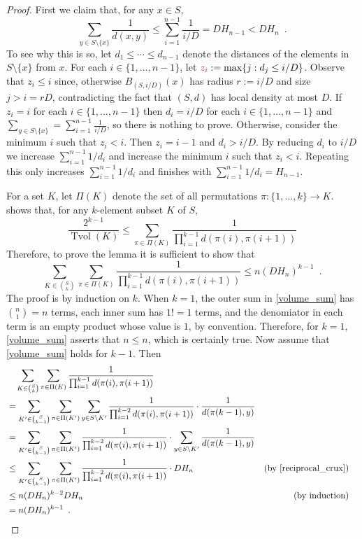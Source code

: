 \documentclass{patmorin}
\makeatletter
\def\mathcolor#1#{\@mathcolor{#1}}
\def\@mathcolor#1#2#3{%
  \protect\leavevmode
  \begingroup
    \color#1{#2}#3%
  \endgroup
}
\newcommand{\mathdefin}[1]{\mathcolor{brightmaroon}{#1}}
\DeclareMathOperator{\tvol}{Tvol}
\makeatother
\begin{document}
\begin{proof}
  First we claim that, for any $x\in S$,
  \begin{equation}
    \sum_{y\in S\setminus\{x\}} \frac{1}{d(x,y)} \le \sum_{i=1}^{n-1}\frac{1}{i/D} = DH_{n-1} < DH_n \enspace . \label{reciprocal_crux}
  \end{equation}
  To see why this is so, let $d_1\le\cdots\le d_{n-1}$ denote the distances of the elements in $S\setminus\{x\}$ from $x$.  For each $i\in\{1,\ldots,n-1\}$, let $\mathdefin{z_i}:=\max\{j: d_j \le i/D\}$. Observe that $z_i \le i$ since, otherwise $B_{(S,i/D)}(x)$ has radius $r:=i/D$ and size $j>i=rD$, contradicting the fact that $(S,d)$ has local density at most $D$.  If $z_i=i$ for each $i\in\{1,\ldots,n-1\}$ then $d_i=i/D$ for each $i\in\{1,\ldots,n-1\}$ and $\sum_{y\in S\setminus\{x\}}=\sum_{i=1}^{n-1}\frac{1}{i/D}$, so there is nothing to prove.  Otherwise, consider the minimum $i$ such that $z_i < i$.  Then $z_i=i-1$ and $d_i > i/D$. By reducing $d_i$ to $i/D$ we increase $\sum_{i=1}^{n-1} 1/d_i$ and increase the minimum $i$ such that $z_i < i$.  Repeating this only increases $\sum_{i=1}^{n-1} 1/d_i$ and finishes with $\sum_{i=1}^{n-1} 1/d_i= H_{n-1}$.

  For a set $K$, let $\Pi(K)$ denote the set of all permutations $\pi:\{1,\ldots,k\}\to K$.
  \citet[Lemma~17]{feige:approximating} shows that, for any $k$-element subset $K$ of $S$,
  \[
    \frac{2^{k-1}}{\tvol(K)} \le \sum_{\pi\in\Pi(K)}\frac{1}{\prod_{i=1}^{k-1}d(\pi(i),\pi(i+1))}
  \]
  Therefore, to prove the lemma it is sufficient to show that
  \begin{equation}
    \sum_{K\in\binom{S}{k}}\sum_{\pi\in\Pi(K)}\frac{1}{\prod_{i=1}^{k-1}d(\pi(i),\pi(i+1))} \le n(DH_n)^{k-1} \enspace .
    \label{volume_sum}
  \end{equation}
  The proof is by induction on $k$.  When $k=1$, the outer sum in \cref{volume_sum} has $\binom{n}{1}=n$ terms, each inner sum has $1!=1$ terms, and the denomiator in each term is an empty product whose value is $1$, by convention.  Therefore, for $k=1$, \cref{volume_sum} asserts that $n \le n$, which is certainly true.  Now assume that \cref{volume_sum} holds for $k-1$.  Then
  \begin{align*}
    & \quad \sum_{K\in\binom{S}{k}}\sum_{\pi\in\Pi(K)}\frac{1}{\prod_{i=1}^{k-1}d(\pi(i),\pi(i+1))} \\
    & = \sum_{K'\in\binom{S}{k-1}}\sum_{\pi\in\Pi(K')}\sum_{y\in S\setminus K'}\frac{1}{\prod_{i=1}^{k-2}d(\pi(i),\pi(i+1))}\cdot\frac{1}{d(\pi(k-1),y)} \\
    & = \sum_{K'\in\binom{S}{k-1}}\sum_{\pi\in\Pi(K')}\frac{1}{\prod_{i=1}^{k-2}d(\pi(i),\pi(i+1))}\cdot\sum_{y\in S\setminus K'}\frac{1}{d(\pi(k-1),y)} \\
    & \le \sum_{K'\in\binom{S}{k-1}}\sum_{\pi\in\Pi(K')}\frac{1}{\prod_{i=1}^{k-2}d(\pi(i),\pi(i+1))}\cdot DH_n & \text{(by \cref{reciprocal_crux})}\\
    & \le n(DH_n)^{k-2}DH_n & \text{(by induction)}\\
    & = n(DH_n)^{k-1} \enspace . & & \qedhere
  \end{align*}
\end{proof}
\end{document}
